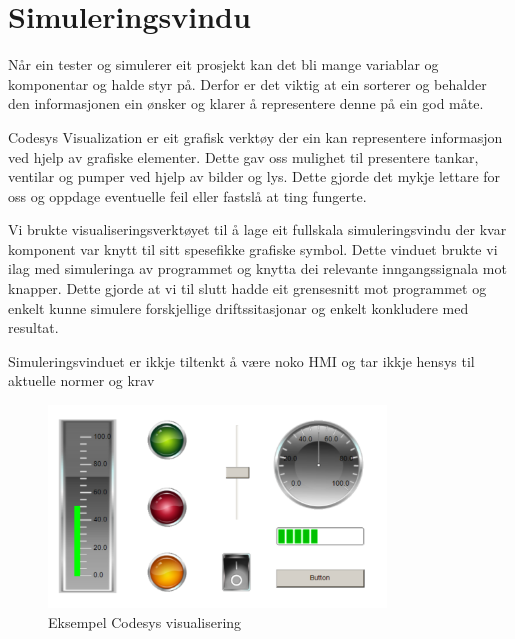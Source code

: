 \section{Simuleringsvindu}
\thispagestyle{fancy}

Når ein tester og simulerer eit prosjekt kan det bli mange variablar og komponentar
og halde styr på. Derfor er det viktig at ein sorterer og behalder den informasjonen ein
ønsker og klarer å representere denne på ein god måte.

Codesys Visualization er eit grafisk verktøy der ein kan representere informasjon
ved hjelp av grafiske elementer. Dette gav oss mulighet til presentere tankar, ventilar og pumper
ved hjelp av bilder og lys. 
Dette gjorde det mykje lettare for oss og oppdage eventuelle feil eller fastslå at ting fungerte.

Vi brukte visualiseringsverktøyet til å lage eit fullskala simuleringsvindu der kvar komponent
var knytt til sitt spesefikke grafiske symbol. Dette vinduet brukte vi ilag med simuleringa
av programmet og knytta dei relevante inngangssignala mot knapper. 
Dette gjorde at vi til slutt hadde eit grensesnitt mot programmet og enkelt kunne simulere
forskjellige driftssitasjonar og enkelt konkludere med resultat.

Simuleringsvinduet er ikkje tiltenkt å være noko 
HMI og tar ikkje hensys til aktuelle normer og krav

\begin{figure}[htbp]
    \centering
    \includegraphics[width=0.8\textwidth]{Bilder/Codesys symbol.png}
    \caption{Eksempel Codesys visualisering}\label{fig:reaktorsoner}
\end{figure}

\newpage

